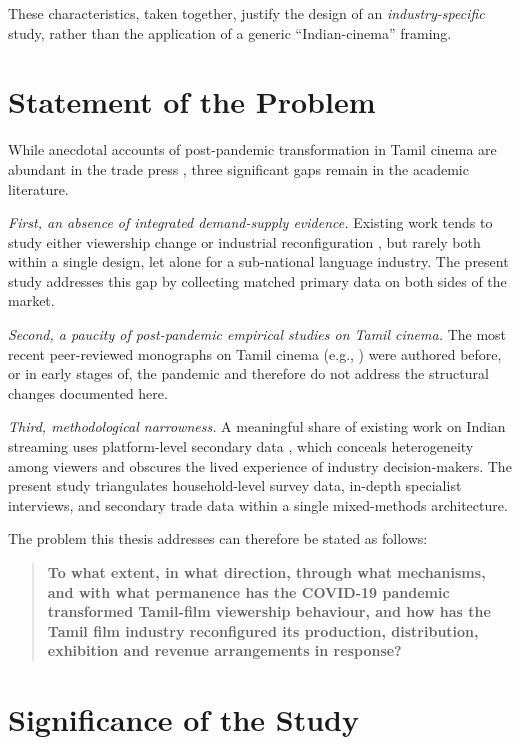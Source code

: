 \noindent
These characteristics, taken together, justify the design of an
\emph{industry-specific} study, rather than the application of a
generic ``Indian-cinema'' framing.

\section{Statement of the Problem}
\label{sec:problem}

While anecdotal accounts of post-pandemic transformation in Tamil
cinema are abundant in the trade press \citep{filmcompanion2022mid,
behindwoods2023}, three significant gaps remain in the academic
literature.

\textit{First, an absence of integrated demand-supply evidence.}
Existing work tends to study either viewership change \citep{
lobato2019,sundet2021} or industrial reconfiguration \citep{
mcdonald2007,curtin2014}, but rarely both within a single design,
let alone for a sub-national language industry.  The present study
addresses this gap by collecting matched primary data on both sides
of the market.

\textit{Second, a paucity of post-pandemic empirical studies on
Tamil cinema.} The most recent peer-reviewed monographs on Tamil
cinema (e.g., \citealp{velayutham2008,prasad2014,nakassis2017}) were
authored before, or in early stages of, the pandemic and therefore
do not address the structural changes documented here.

\textit{Third, methodological narrowness.}  A meaningful share of
existing work on Indian streaming uses platform-level secondary data
\citep{kpmg2022,bcg2022}, which conceals heterogeneity among viewers
and obscures the lived experience of industry decision-makers.  The
present study triangulates household-level survey data, in-depth
specialist interviews, and secondary trade data within a single
mixed-methods architecture.

The problem this thesis addresses can therefore be stated as
follows:

\begin{quote}
\textbf{To what extent, in what direction, through what mechanisms, and
with what permanence has the COVID-19 pandemic transformed Tamil-film
viewership behaviour, and how has the Tamil film industry
reconfigured its production, distribution, exhibition and revenue
arrangements in response?}
\end{quote}

\section{Significance of the Study}
\label{sec:significance}

